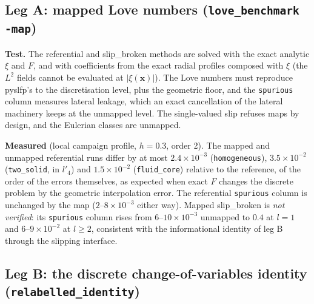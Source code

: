 \documentclass[11pt]{article}
\numberwithin{equation}{section}
\newcommand{\vx}{\mathbf{x}}
\newcommand{\code}[1]{\texttt{#1}}
\begin{document}
\subsection{Leg A: mapped Love numbers (\code{love\_benchmark -map})}

\textbf{Test.} The referential and slip\_broken methods are solved with
the exact analytic $\xi$ and $F$, and with coefficients from the exact
radial profiles composed with $\xi$ (the $L^2$ fields cannot be evaluated
at $|\xi(\vx)|$). The Love numbers must reproduce pyslfp's to the
discretisation level, plus the geometric floor, and the \code{spurious}
column measures lateral leakage, which an exact cancellation of the
lateral machinery keeps at the unmapped level. The single-valued slip
refuses maps by design, and the Eulerian classes are unmapped.

\textbf{Measured} (local campaign profile, $h=0.3$, order 2). The mapped and
unmapped referential runs differ by at most $2.4\times10^{-3}$
(\code{homogeneous}), $3.5\times10^{-2}$ (\code{two\_solid}, in $l'_4$) and
$1.5\times10^{-2}$ (\code{fluid\_core}) relative to the reference, of the
order of the errors themselves, as expected when exact $F$ changes the
discrete problem by the geometric interpolation error. The referential
\code{spurious} column is unchanged by the map ($2$--$8\times10^{-3}$ either
way). Mapped slip\_broken is \emph{not verified}: its \code{spurious}
column rises from $6$--$10\times10^{-3}$ unmapped to $0.4$ at $l=1$ and
$6$--$9\times10^{-2}$ at $l\ge2$, consistent with the informational
identity of leg B through the slipping interface.

\subsection{Leg B: the discrete change-of-variables identity (\code{relabelled\_identity})}
\end{document}
